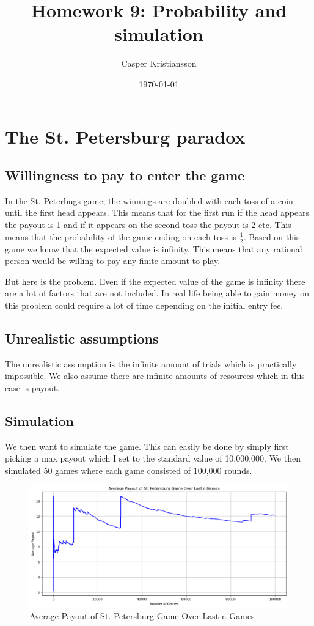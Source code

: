 \documentclass{article}
\title{Homework 9: Probability and simulation}
\author{Casper Kristiansson}
\date{\today}
\begin{document}
\maketitle

\section{The St. Petersburg paradox}
\subsection{Willingness to pay to enter the game}
In the St. Peterbugs game, the winnings are doubled with each toss of a coin until the first head appears. This means that for the first run if the head appears the payout is 1 and if it appears on the second toss the payout is 2 etc. This means that the probability of the game ending on each toss is \(\frac{1}{2}\). Based on this game we know that the expected value is infinity. This means that any rational person would be willing to pay any finite amount to play.

But here is the problem. Even if the expected value of the game is infinity there are a lot of factors that are not included. In real life being able to gain money on this problem could require a lot of time depending on the initial entry fee.

\subsection{Unrealistic assumptions}
The unrealistic assumption is the infinite amount of trials which is practically impossible. We also assume there are infinite amounts of resources which in this case is payout.

\subsection{Simulation}
We then want to simulate the game. This can easily be done by simply first picking a max payout which I set to the standard value of 10,000,000. We then simulated 50 games where each game consisted of 100,000 rounds.

\begin{figure}[H]
    \centering
    \includegraphics[width=\textwidth]{HW9.png}
    \caption{Average Payout of St. Petersburg Game Over Last n Games}
    \label{fig:graph}
\end{figure}
\end{document}
